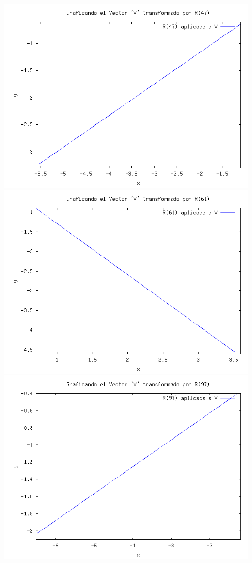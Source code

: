 \begin{enumerate}
		\includegraphics[scale=0.3]{imagenes/3_vc.png}\\
		\includegraphics[scale=0.3]{imagenes/3_vd.png}
		\includegraphics[scale=0.3]{imagenes/3_ve.png}
		

\end{enumerate}
